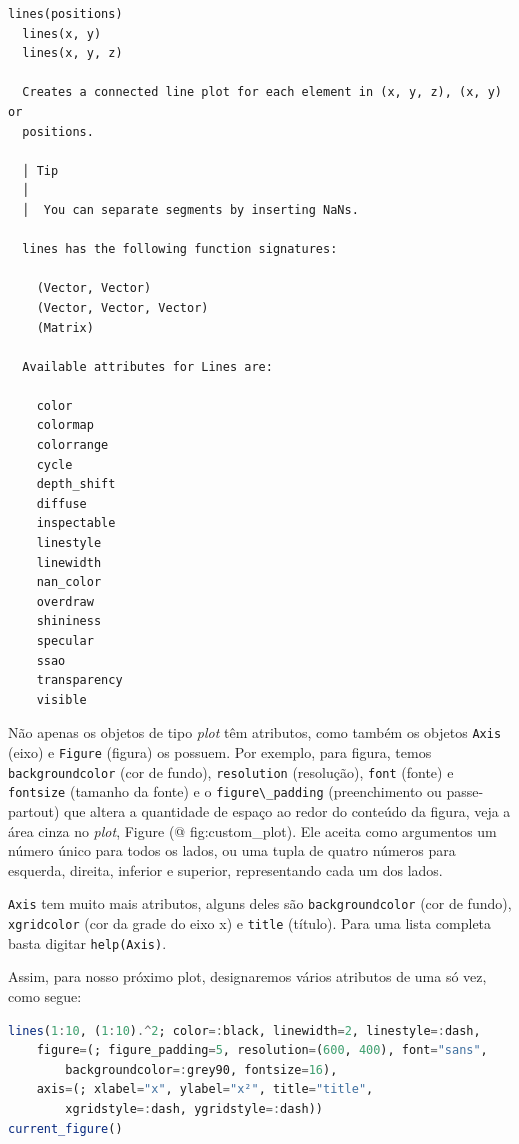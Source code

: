 \documentclass[
  notoc %
]{tufte-book}
\newcommand{\passthrough}[1]{#1}
\begin{document}
\begin{lstlisting}[language=Output]
  lines(positions)
  lines(x, y)
  lines(x, y, z)

  Creates a connected line plot for each element in (x, y, z), (x, y) or
  positions.

  │ Tip
  │
  │  You can separate segments by inserting NaNs.

  lines has the following function signatures:

    (Vector, Vector)
    (Vector, Vector, Vector)
    (Matrix)

  Available attributes for Lines are:

    color
    colormap
    colorrange
    cycle
    depth_shift
    diffuse
    inspectable
    linestyle
    linewidth
    nan_color
    overdraw
    shininess
    specular
    ssao
    transparency
    visible
\end{lstlisting}

Não apenas os objetos de tipo \emph{plot} têm atributos, como também os
objetos \passthrough{\lstinline!Axis!} (eixo) e
\passthrough{\lstinline!Figure!} (figura) os possuem. Por exemplo, para
figura, temos \passthrough{\lstinline!backgroundcolor!} (cor de fundo),
\passthrough{\lstinline!resolution!} (resolução),
\passthrough{\lstinline!font!} (fonte) e
\passthrough{\lstinline!fontsize!} (tamanho da fonte) e o
\passthrough{\lstinline!figure\_padding!} (preenchimento ou
passe-partout) que altera a quantidade de espaço ao redor do conteúdo da
figura, veja a área cinza no \emph{plot}, Figure (@ fig:custom\_plot).
Ele aceita como argumentos um número único para todos os lados, ou uma
tupla de quatro números para esquerda, direita, inferior e superior,
representando cada um dos lados.

\passthrough{\lstinline!Axis!} tem muito mais atributos, alguns deles
são \passthrough{\lstinline!backgroundcolor!} (cor de fundo),
\passthrough{\lstinline!xgridcolor!} (cor da grade do eixo x) e
\passthrough{\lstinline!title!} (título). Para uma lista completa basta
digitar \passthrough{\lstinline!help(Axis)!}.

Assim, para nosso próximo plot, designaremos vários atributos de uma só
vez, como segue:

\begin{lstlisting}[language=Julia]
lines(1:10, (1:10).^2; color=:black, linewidth=2, linestyle=:dash,
    figure=(; figure_padding=5, resolution=(600, 400), font="sans",
        backgroundcolor=:grey90, fontsize=16),
    axis=(; xlabel="x", ylabel="x²", title="title",
        xgridstyle=:dash, ygridstyle=:dash))
current_figure()
\end{lstlisting}
\end{document}
